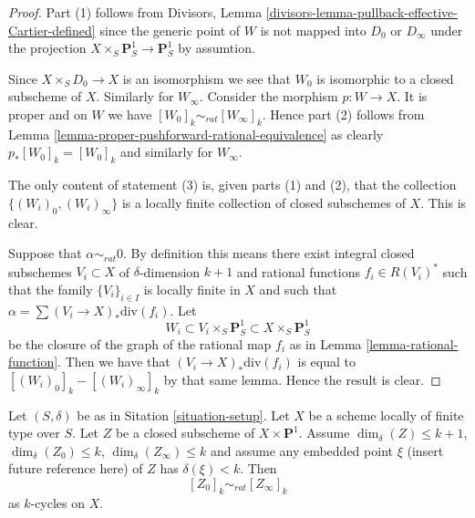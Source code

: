 \begin{proof}
Part (1) follows from
Divisors, Lemma \ref{divisors-lemma-pullback-effective-Cartier-defined}
since the generic point
of $W$ is not mapped into $D_0$ or $D_\infty$ under the projection
$X \times_S \mathbf{P}^1_S \to \mathbf{P}^1_S$ by assumtion.

\medskip\noindent
Since $X \times_S D_0 \to X$ is an isomorphism we see that $W_0$
is isomorphic to a closed subscheme of $X$. Similarly for $W_\infty$.
Consider the morphism $p : W \to X$. It is proper and on $W$ we have
$[W_0]_k \sim_{rat} [W_\infty]_k$. Hence part (2) follows from
Lemma \ref{lemma-proper-pushforward-rational-equivalence} as clearly
$p_*[W_0]_k = [W_0]_k$ and similarly for $W_\infty$.

\medskip\noindent
The only content of statement (3) is, given parts (1) and (2), that
the collection $\{(W_i)_0, (W_i)_\infty\}$ is a locally finite collection
of closed subschemes of $X$. This is clear.

\medskip\noindent
Suppose that $\alpha \sim_{rat} 0$.
By definition this means there exist integral closed subschemes
$V_i \subset X$ of $\delta$-dimension $k + 1$ and rational
functions $f_i \in R(V_i)^*$ such that the family
$\{V_i\}_{i \in I}$ is locally finite in $X$ and such that
$\alpha = \sum (V_i \to X)_*\text{div}(f_i)$.
Let
$$
W_i \subset V_i \times_S \mathbf{P}^1_S \subset X \times_S \mathbf{P}^1_S
$$
be the closure of the graph of the rational map $f_i$ as in
Lemma \ref{lemma-rational-function}.
Then we have that $(V_i \to X)_*\text{div}(f_i)$
is equal to $[(W_i)_0]_k - [(W_i)_\infty]_k$ by that same lemma.
Hence the result is clear.
\end{proof}

\begin{lemma}
\label{lemma-closed-subscheme-cross-p1}
Let $(S, \delta)$ be as in Sitation \ref{situation-setup}.
Let $X$ be a scheme locally of finite type over $S$.
Let $Z$ be a closed subscheme of $X \times \mathbf{P}^1$.
Assume $\dim_\delta(Z) \leq k + 1$, $\dim_\delta(Z_0) \leq k$,
$\dim_\delta(Z_\infty) \leq k$ and assume
any embedded point $\xi$ (insert future reference here)
of $Z$ has $\delta(\xi) < k$. Then
$$
[Z_0]_k \sim_{rat} [Z_\infty]_k
$$
as $k$-cycles on $X$.
\end{lemma}

